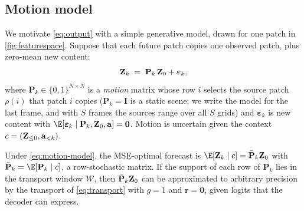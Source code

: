 \subsection{Motion model}
\label{sec:theory}
We motivate \cref{eq:output} with a simple generative model, drawn for one patch in \cref{fig:featurespace}.
%
Suppose that each future patch copies one observed patch, plus zero-mean new content:
\begin{equation}
  \mathbf{Z}_k \;=\; \mathbf{P}_k\,\mathbf{Z}_0 + \boldsymbol{\varepsilon}_k,
  \label{eq:motion-model}
\end{equation}
where $\mathbf{P}_k\in\{0,1\}^{N\times N}$ is a \emph{motion} matrix whose row $i$ selects the source patch $\rho(i)$
that patch $i$ copies ($\mathbf{P}_k=\mathbf{I}$ is a static scene; we write the model for the last frame, and with $S$
frames the sources range over all $S$ grids) and $\bm{\varepsilon}_k$ is new content with
$\E[\bm{\varepsilon}_k\mid\mathbf{P}_k,\Z_0,\mathbf{a}]=\mathbf{0}$. Motion is uncertain given the context $c=(\mathbf{Z}_{\le 0},\mathbf{a}_{<k})$.

\begin{proposition}\label{prop:bayes}
Under \cref{eq:motion-model}, the MSE-optimal forecast is
$\E[\Z_k\mid c]=\bar{\mathbf{P}}_k\Z_0$ with $\bar{\mathbf{P}}_k=\E[\mathbf{P}_k\mid c]$, a row-stochastic matrix.
If the support of each row of $\mathbf{P}_k$ lies in the transport window $\mathcal{W}$, then $\bar{\mathbf{P}}_k\mathbf{Z}_0$
can be approximated to arbitrary precision by the transport of \cref{eq:transport} with $g{=}1$ and
$\mathbf{r}{=}\mathbf{0}$, given logits that the decoder can express.
\end{proposition}

